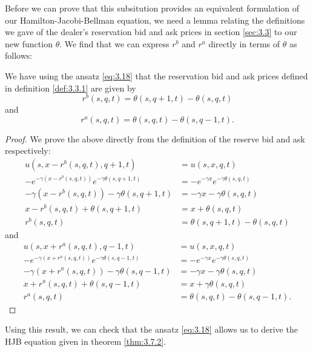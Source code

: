 Before we can prove that this subsitution provides an equivalent formulation of our
Hamilton-Jacobi-Bellman equation, we need a lemma relating the definitions we gave
of the dealer's reservation bid and ask prices in section \ref{sec:3.3} to our new
function $\theta$. We find that we can express $r^b$ and $r^a$ directly in terms of 
$\theta$ as follows:
\begin{lemma}\label{lem:3.7.3}
    We have using the ansatz \ref{eq:3.18} that the reservation bid and ask prices
    defined in definition \ref{def:3.3.1} are given by
    \begin{equation}
        r^b(s,q,t)=\theta(s,q+1,t)-\theta(s,q,t)
    \end{equation}
    and
    \begin{equation}
        r^a(s,q,t)=\theta(s,q,t)-\theta(s,q-1,t).
    \end{equation}
\end{lemma}
\begin{proof}
    We prove the above directly from the definition of the reserve bid and ask 
    respectively:
    \begin{align*}
        u(s,x-r^b(s,q,t),q+1,t)&=u(s,x,q,t)\\
        -e^{-\gamma(x-r^b(s,q,t))}e^{-\gamma\theta(s,q+1,t)}&=-e^{-\gamma x}e^{-\gamma\theta(s,q,t)}\\
        -\gamma(x-r^b(s,q,t))-\gamma\theta(s,q+1,t)&=-\gamma x-\gamma\theta(s,q,t)\\
        x-r^b(s,q,t)+\theta(s,q+1,t)&=x+\theta(s,q,t)\\
        r^b(s,q,t)&=\theta(s,q+1,t)-\theta(s,q,t)
    \end{align*}
    and
    \begin{align*}
        u(s,x+r^a(s,q,t),q-1,t)&=u(s,x,q,t)\\
        -e^{-\gamma(x+r^a(s,q,t))}e^{-\gamma\theta(s,q-1,t)}&=-e^{-\gamma x}e^{-\gamma\theta(s,q,t)}\\
        -\gamma(x+r^a(s,q,t))-\gamma\theta(s,q-1,t)&=-\gamma x-\gamma\theta(s,q,t)\\
        x+r^a(s,q,t)+\theta(s,q-1,t)&=x+\gamma\theta(s,q,t)\\
        r^a(s,q,t)&=\theta(s,q,t)-\theta(s,q-1,t).
    \end{align*}
\end{proof}

Using this result, we can check that the ansatz \ref{eq:3.18} allows us to derive 
the HJB equation given in theorem \ref{thm:3.7.2}.

